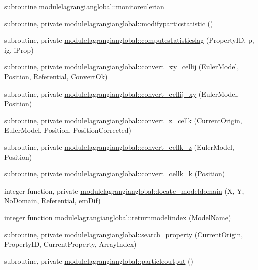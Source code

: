 \begin{DoxyCompactItemize}
\item 
subroutine \mbox{\hyperlink{namespacemodulelagrangianglobal_a6480946d4669725ebee110f6be9fba5b}{modulelagrangianglobal\+::monitoreulerian}}
\item 
subroutine, private \mbox{\hyperlink{namespacemodulelagrangianglobal_a3039668c6b76c0fdde5ffdc19ebdfe88}{modulelagrangianglobal\+::modifyparticstatistic}} ()
\item 
subroutine, private \mbox{\hyperlink{namespacemodulelagrangianglobal_a45258b52ee78ddc9c21fca279fad88da}{modulelagrangianglobal\+::computestatisticslag}} (Property\+ID, p, ig, i\+Prop)
\item 
subroutine, private \mbox{\hyperlink{namespacemodulelagrangianglobal_a713100b692a8ced1a6b27a0a1baa4039}{modulelagrangianglobal\+::convert\+\_\+xy\+\_\+cellij}} (Euler\+Model, Position, Referential, Convert\+Ok)
\item 
subroutine, private \mbox{\hyperlink{namespacemodulelagrangianglobal_a7c1bdff13dafe0f3f6c8cd12a1398401}{modulelagrangianglobal\+::convert\+\_\+cellij\+\_\+xy}} (Euler\+Model, Position)
\item 
subroutine, private \mbox{\hyperlink{namespacemodulelagrangianglobal_a619a331b54dcc8d330ab6dd05b4eae56}{modulelagrangianglobal\+::convert\+\_\+z\+\_\+cellk}} (Current\+Origin, Euler\+Model, Position, Position\+Corrected)
\item 
subroutine, private \mbox{\hyperlink{namespacemodulelagrangianglobal_ab7f2f6590a59e52fd0c30cdc7445acee}{modulelagrangianglobal\+::convert\+\_\+cellk\+\_\+z}} (Euler\+Model, Position)
\item 
subroutine, private \mbox{\hyperlink{namespacemodulelagrangianglobal_a75785d33db5dded34e1de495fe447eac}{modulelagrangianglobal\+::convert\+\_\+cellk\+\_\+k}} (Position)
\item 
integer function, private \mbox{\hyperlink{namespacemodulelagrangianglobal_a814ff42a8e2efd519388bc94964a3d13}{modulelagrangianglobal\+::locate\+\_\+modeldomain}} (X, Y, No\+Domain, Referential, em\+Dif)
\item 
integer function \mbox{\hyperlink{namespacemodulelagrangianglobal_a446618968d07df360f90a4ddc2d93a99}{modulelagrangianglobal\+::returnmodelindex}} (Model\+Name)
\item 
subroutine, private \mbox{\hyperlink{namespacemodulelagrangianglobal_a8101ab80f9478c6164ad8c0d0261efd1}{modulelagrangianglobal\+::search\+\_\+property}} (Current\+Origin, Property\+ID, Current\+Property, Array\+Index)
\item 
subroutine, private \mbox{\hyperlink{namespacemodulelagrangianglobal_af6d6a080c97a72125b4959aa01edffd8}{modulelagrangianglobal\+::particleoutput}} ()

\end{DoxyCompactItemize}

